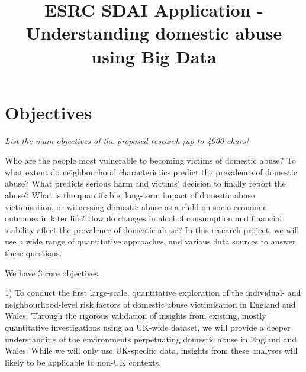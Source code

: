 \documentclass[11pt, a4paper]{article}
\begin{document}
\title{ESRC SDAI Application - Understanding domestic abuse using Big Data}
\date{}
\maketitle
\section{Objectives}

%
%
%
%

\textit{List the main objectives of the proposed research [up to 4000 chars]}

Who are the people most vulnerable to becoming victims of domestic abuse? To what extent do neighbourhood characteristics predict the prevalence of domestic abuse? What predicts serious harm and victims' decision to finally report the abuse? What is the quantifiable, long-term impact of domestic abuse victimisation, or witnessing domestic abuse as a child on socio-economic outcomes in later life? How do changes in alcohol consumption and financial stability affect the prevalence of domestic abuse? In this research project, we will use a wide range of quantitative approaches, and various data sources to answer these questions.

We have 3 core objectives. 

1) To conduct the first large-scale, quantitative exploration of the individual- and neighbourhood-level risk factors of domestic abuse victimisation in England and Wales. Through the rigorous validation of insights from existing, mostly quantitative investigations using an UK-wide dataset, we will provide a deeper understanding of the environments perpetuating domestic abuse in England and Wales. While we will only use UK-specific data, insights from these analyses will likely to be applicable to non-UK contexts. 
\end{document}

